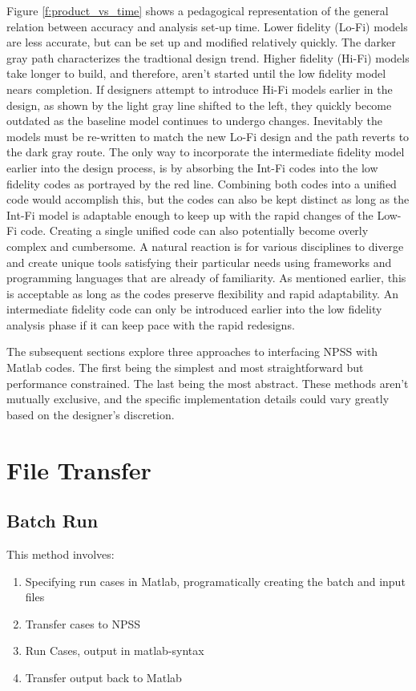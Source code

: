 \documentclass[heading.tex]{subfiles}
\begin{document}
Figure \ref{f:product_vs_time} shows a pedagogical representation of the general relation between accuracy and analysis set-up time. Lower fidelity (Lo-Fi) models are less accurate, but can be set up and modified relatively quickly. The darker gray path characterizes the tradtional design trend. Higher fidelity (Hi-Fi) models take longer to build, and therefore, aren't started until the low fidelity model nears completion. If designers attempt to introduce Hi-Fi models earlier in the design, as shown by the light gray line shifted to the left, they quickly become outdated as the baseline model continues to undergo changes. Inevitably the models must be re-written to match the new Lo-Fi design and the path reverts to the dark gray route. The only way to incorporate the intermediate fidelity model earlier into the design process, is by absorbing the Int-Fi codes into the low fidelity codes as portrayed by the red line. Combining both codes into a unified code would accomplish this, but the codes can also be kept distinct as long as the Int-Fi model is adaptable enough to keep up with the rapid changes of the Low-Fi code. Creating a single unified code can also potentially become overly complex and cumbersome. A natural reaction is for various disciplines to diverge and create unique tools satisfying their particular needs using frameworks and programming languages that are already of familiarity. As mentioned earlier, this is acceptable as long as the codes preserve flexibility and rapid adaptability. An intermediate fidelity code can only be introduced earlier into the low fidelity analysis phase if it can keep pace with the rapid redesigns.

The subsequent sections explore three approaches to interfacing NPSS with Matlab codes. The first being the simplest and most straightforward but performance constrained. The last being the most abstract. These methods aren't mutually exclusive, and the specific implementation details could vary greatly based on the designer's discretion.

\section{File Transfer}
\subsection{Batch Run}
This method involves:

\begin{enumerate}
  \item Specifying run cases in Matlab, programatically creating the batch and input files
  \item Transfer cases to NPSS
  \item Run Cases, output in matlab-syntax
  \item Transfer output back to Matlab
\end{enumerate}
\end{document}
